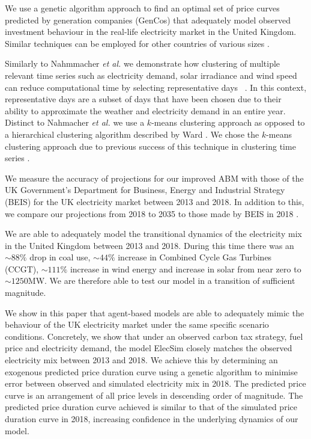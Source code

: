 

We use a genetic algorithm approach to find an optimal set of price curves predicted by generation companies (GenCos) that  adequately model observed investment behaviour in the real-life electricity market in the United Kingdom. Similar techniques can be employed for other countries of various sizes \cite{Kell}. 


Similarly to Nahmmacher \textit{et al.} we demonstrate how clustering of multiple relevant time series such as electricity demand, solar irradiance and wind speed can reduce computational time by selecting representative days ~\cite{Nahmmacher2016}. In this context, representative days are a subset of days that have been chosen due to their ability to approximate the weather and electricity demand in an entire year. Distinct to Nahmacher \textit{et al.} we use a $k$-means clustering approach \cite{forgy65} as opposed to a hierarchical clustering algorithm described by Ward \cite{doi:10.1080/01621459.1963.10500845}. We chose the $k$-means clustering approach due to previous success of this technique in clustering time series \cite{Kell2018a}. 

We measure the accuracy of projections for our improved ABM with those of the UK Government's Department for Business, Energy and Industrial Strategy (BEIS) for the UK electricity market between 2013 and 2018. In addition to this, we compare our projections from 2018 to 2035 to those made by BEIS in 2018 \cite{DBEIS2019}.

We are able to adequately model the transitional dynamics of the electricity mix in the United Kingdom between 2013 and 2018. During this time there was an ${\sim}88\%$ drop in coal use, ${\sim}44\%$ increase in Combined Cycle Gas Turbines (CCGT), ${\sim}111\% $ increase in wind energy and increase in solar from near zero to ${\sim}1250$MW. We are therefore able to test our model in a transition of sufficient magnitude.






We show in this paper that agent-based models are able to adequately mimic the behaviour of the UK electricity market under the same specific scenario conditions. Concretely, we show that under an observed carbon tax strategy, fuel price and electricity demand, the model ElecSim closely matches the observed electricity mix between 2013 and 2018. We achieve this by determining an exogenous predicted price duration curve using a genetic algorithm to minimise error between observed and simulated electricity mix in 2018. The predicted price curve is an arrangement of all price levels in descending order of magnitude. The predicted price duration curve achieved is similar to that of the simulated price duration curve in 2018, increasing confidence in the underlying dynamics of our model. 

